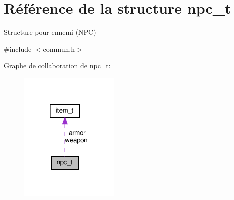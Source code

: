 \hypertarget{structnpc__t}{}\section{Référence de la structure npc\+\_\+t}
\label{structnpc__t}


Structure pour ennemi (N\+PC)  




{\ttfamily \#include $<$commun.\+h$>$}



Graphe de collaboration de npc\+\_\+t\+:
\nopagebreak
\begin{figure}[H]
\begin{center}
\leavevmode
\includegraphics[width=136pt]{structnpc__t__coll__graph}
\end{center}
\end{figure}
